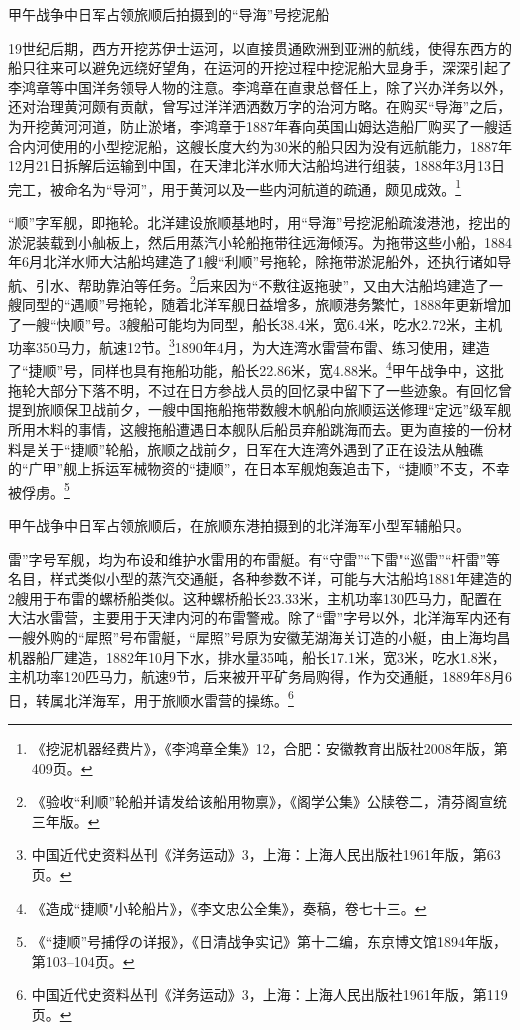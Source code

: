 \documentclass[12pt,UTF8]{ctexbook}
\begin{document}
甲午战争中日军占领旅顺后拍摄到的“导海”号挖泥船

19世纪后期，西方开挖苏伊士运河，以直接贯通欧洲到亚洲的航线，使得东西方的船只往来可以避免远绕好望角，在运河的开挖过程中挖泥船大显身手，深深引起了李鸿章等中国洋务领导人物的注意。李鸿章在直隶总督任上，除了兴办洋务以外，还对治理黄河颇有贡献，曾写过洋洋洒洒数万字的治河方略。在购买“导海”之后，为开挖黄河河道，防止淤堵，李鸿章于1887年春向英国山姆达造船厂购买了一艘适合内河使用的小型挖泥船，这艘长度大约为30米的船只因为没有远航能力，1887年12月21日拆解后运输到中国，在天津北洋水师大沽船坞进行组装，1888年3月13日完工，被命名为“导河”，用于黄河以及一些内河航道的疏通，颇见成效。\footnote{《挖泥机器经费片》，《李鸿章全集》12，合肥：安徽教育出版社2008年版，第409页。}

“顺”字军舰，即拖轮。北洋建设旅顺基地时，用“导海”号挖泥船疏浚港池，挖出的淤泥装载到小舢板上，然后用蒸汽小轮船拖带往远海倾泻。为拖带这些小船，1884年6月北洋水师大沽船坞建造了1艘“利顺”号拖轮，除拖带淤泥船外，还执行诸如导航、引水、帮助靠泊等任务。\footnote{《验收“利顺”轮船并请发给该船用物禀》，《阁学公集》公牍卷二，清芬阁宣统三年版。}后来因为“不敷往返拖驶”，又由大沽船坞建造了一艘同型的“遇顺”号拖轮，随着北洋军舰日益增多，旅顺港务繁忙，1888年更新增加了一艘“快顺”号。3艘船可能均为同型，船长38.4米，宽6.4米，吃水2.72米，主机功率350马力，航速12节。\footnote{中国近代史资料丛刊《洋务运动》3，上海：上海人民出版社1961年版，第63页。}1890年4月，为大连湾水雷营布雷、练习使用，建造了“捷顺”号，同样也具有拖船功能，船长22.86米，宽4.88米。\footnote{《造成“捷顺"小轮船片》，《李文忠公全集》，奏稿，卷七十三。}甲午战争中，这批拖轮大部分下落不明，不过在日方参战人员的回忆录中留下了一些迹象。有回忆曾提到旅顺保卫战前夕，一艘中国拖船拖带数艘木帆船向旅顺运送修理“定远”级军舰所用木料的事情，这艘拖船遭遇日本舰队后船员弃船跳海而去。更为直接的一份材料是关于“捷顺”轮船，旅顺之战前夕，日军在大连湾外遇到了正在设法从触礁的“广甲”舰上拆运军械物资的“捷顺”，在日本军舰炮轰追击下，“捷顺”不支，不幸被俘虏。\footnote{《“捷顺”号捕俘の详报》，《日清战争实记》第十二编，东京博文馆1894年版，第103--104页。}

甲午战争中日军占领旅顺后，在旅顺东港拍摄到的北洋海军小型军辅船只。

雷”字号军舰，均为布设和维护水雷用的布雷艇。有“守雷”“下雷"“巡雷”“杆雷”等名目，样式类似小型的蒸汽交通艇，各种参数不详，可能与大沽船坞1881年建造的2艘用于布雷的螺桥船类似。这种螺桥船长23.33米，主机功率130匹马力，配置在大沽水雷营，主要用于天津内河的布雷警戒。除了“雷”字号以外，北洋海军内还有一艘外购的“犀照”号布雷艇，“犀照”号原为安徽芜湖海关订造的小艇，由上海均昌机器船厂建造，1882年10月下水，排水量35吨，船长17.1米，宽3米，吃水1.8米，主机功率120匹马力，航速9节，后来被开平矿务局购得，作为交通艇，1889年8月6日，转属北洋海军，用于旅顺水雷营的操练。\footnote{中国近代史资料丛刊《洋务运动》3，上海：上海人民出版社1961年版，第119页。}
\end{document}
